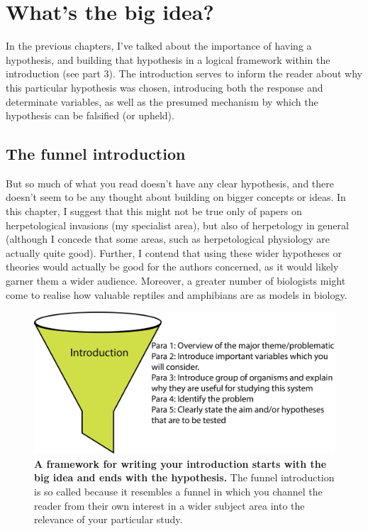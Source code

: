 \documentclass[
]{krantz}
\begin{document}
\hypertarget{bigidea}{%
\section{What's the big idea?}\label{bigidea}}

In the previous chapters, I've talked about the importance of having a hypothesis, and building that hypothesis in a logical framework within the introduction (see part 3). The introduction serves to inform the reader about why this particular hypothesis was chosen, introducing both the response and determinate variables, as well as the presumed mechanism by which the hypothesis can be falsified (or upheld).

\hypertarget{the-funnel-introduction}{%
\subsection{The funnel introduction}\label{the-funnel-introduction}}

But so much of what you read doesn't have any clear hypothesis, and there doesn't seem to be any thought about building on bigger concepts or ideas. In this chapter, I suggest that this might not be true only of papers on herpetological invasions (my specialist area), but also of herpetology in general (although I concede that some areas, such as herpetological physiology are actually quite good). Further, I contend that using these wider hypotheses or theories would actually be good for the authors concerned, as it would likely garner them a wider audience. Moreover, a greater number of biologists might come to realise how valuable reptiles and amphibians are as models in biology.



\begin{figure}

\includegraphics[width=0.9\linewidth]{figures/Introduction} \hfill{}

\caption{\textbf{A framework for writing your introduction starts with the big idea and ends with the hypothesis.} The funnel introduction is so called because it resembles a funnel in which you channel the reader from their own interest in a wider subject area into the relevance of your particular study.}\label{fig:Introfunnel}
\end{figure}
\end{document}
